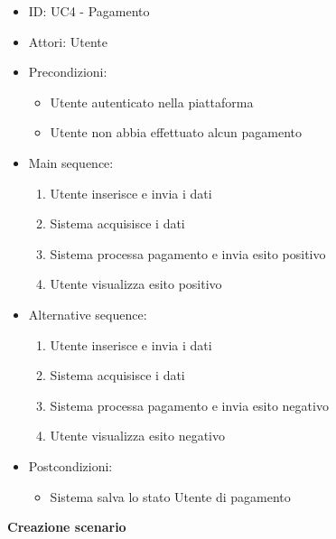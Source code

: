 \documentclass{article}
\begin{document}
\begin{itemize}[label = { }]
    \itemsep0px
    \item ID: UC4 - Pagamento
    \item Attori: Utente
    \item Precondizioni: 
        \begin{itemize}[label = {-}]
            \item Utente autenticato nella piattaforma
            \item Utente non abbia effettuato alcun pagamento
        \end{itemize}
    \item Main sequence: 
        \begin{enumerate}
            \item Utente inserisce e invia i dati
            \item Sistema acquisisce i dati
            \item Sistema processa pagamento e invia esito positivo
            \item Utente visualizza esito positivo
        \end{enumerate}
    \item Alternative sequence:
        \begin{enumerate}
            \item Utente inserisce e invia i dati
            \item Sistema acquisisce i dati
            \item Sistema processa pagamento e invia esito negativo
            \item Utente visualizza esito negativo
        \end{enumerate}
    \item Postcondizioni: 
        \begin{itemize}[label = {-}]
            \item Sistema salva lo stato Utente di pagamento
        \end{itemize}
\end{itemize}
\newpage
\textbf{Creazione scenario}
\end{document}
